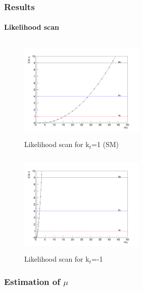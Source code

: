 \documentclass[11pt]{beamer}
\begin{document}
\begin{frame}
\frametitle{Results}
\framesubtitle{Likelihood scan}
\begin{minipage}{0.5\textwidth}
	\begin{center}
		\begin{figure}
			\includegraphics[width=6cm,height=5cm]{figures/Likelihood.png}
			\caption*{Likelihood scan for k$_t$=1 (SM)}
		\end{figure}
	\end{center}
\end{minipage}\hfill
\begin{minipage}{0.5\textwidth}
	\begin{center}
		\begin{figure}
			\includegraphics[width=6cm,height=5cm]{figures/Likelihood-kt-1.png}
			\caption*{Likelihood scan for k$_t$=-1}
		\end{figure}
	\end{center}
\end{minipage}
\end{frame}

\begin{frame}
\frametitle{Estimation of $\mu$}

\end{frame}
\end{document}
